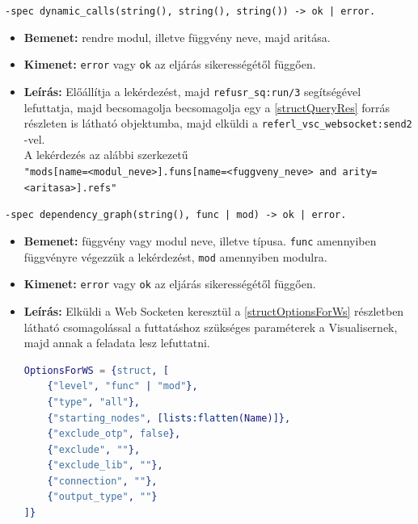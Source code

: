     \noindent \lstinline{-spec dynamic_calls(string(), string(), string()) -> ok | error.}
    \begin{itemize}
        \item \textbf{Bemenet:} rendre modul, illetve függvény neve, majd aritása.
        \item \textbf{Kimenet:} \lstinline{error} vagy \lstinline{ok} az eljárás sikerességétől függően.
        \item \textbf{Leírás:} Előállítja a lekérdezést, majd \lstinline{refusr_sq:run/3} segítségével lefuttatja, majd becsomagolja becsomagolja egy a \ref{structQueryRes} forrás részleten is látható objektumba, majd elküldi a \lstinline{referl_vsc_websocket:send2} -vel. \\
        A lekérdezés az alábbi szerkezetű \\ 
        \lstinline{"mods[name=<modul_neve>].funs[name=<fuggveny_neve> and arity=<aritasa>].refs"}
    \end{itemize}
    
    
    \noindent \lstinline{-spec dependency_graph(string(), func | mod) -> ok | error.}
    \begin{itemize}
        \item \textbf{Bemenet:} függvény vagy modul neve, illetve típusa. \lstinline{func} amennyiben függvényre végezzük a lekérdezést, \lstinline{mod} amennyiben modulra.
        \item \textbf{Kimenet:} \lstinline{error} vagy \lstinline{ok} az eljárás sikerességétől függően.
        \item \textbf{Leírás:} Elküldi a Web Socketen keresztül a \ref{structOptionsForWs} részletben látható csomagolással a futtatáshoz szükséges paraméterek a Visualisernek, majd annak a feladata lesz lefuttatni. \\ \newpage
\lstset{caption=Web Socketen keresztül küldött opciók, label=structOptionsForWs}  
\begin{lstlisting}[language={erlang}] 
OptionsForWS = {struct, [
    {"level", "func" | "mod"},
    {"type", "all"},
    {"starting_nodes", [lists:flatten(Name)]},
    {"exclude_otp", false},
    {"exclude", ""},
    {"exclude_lib", ""},
    {"connection", ""},
    {"output_type", ""}
]}
\end{lstlisting}
    \end{itemize}
    
   






